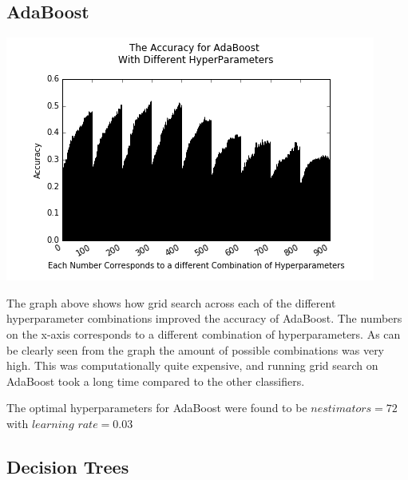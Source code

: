 \documentclass{article}
\begin{document}
\subsection{AdaBoost}

\includegraphics[scale=0.6]{adaboost_crop}

The graph above shows how grid search across each of the different hyperparameter combinations improved the accuracy of AdaBoost. The numbers on the x-axis corresponds to a different combination of hyperparameters. As can be clearly seen from the graph the amount of possible combinations was very high. This was computationally quite expensive, and running grid search on AdaBoost took a long time compared to the other classifiers. 

The optimal hyperparameters for AdaBoost were found to be $n$\textunderscore $estimators = 72$ with $learning$ \textunderscore $rate = 0.03$

\subsection{Decision Trees}
\end{document}
